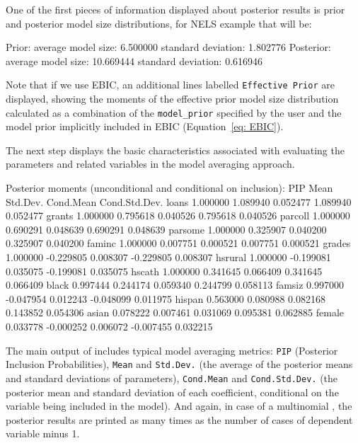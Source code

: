 One of the first pieces of information displayed about
posterior results is prior and posterior model size
distributions, for NELS example that will be:
\begin{CodeChunk}\begin{CodeOutput}
Prior:
	average model size: 6.500000
	standard deviation: 1.802776
Posterior:
	average model size: 10.669444
	standard deviation: 0.616946
\end{CodeOutput}
\end{CodeChunk}

Note that if we use EBIC, an additional lines labelled
\texttt{Effective Prior} are displayed, showing the moments
of the effective prior model size distribution calculated as
a combination of the \texttt{model\_prior} specified by
the user and the model prior implicitly included in EBIC
(Equation~\ref{eq: EBIC}).

The next step displays the basic characteristics associated
with evaluating the parameters and related variables in the
model averaging approach.
\begin{CodeChunk}\begin{CodeOutput}
  Posterior moments (unconditional and conditional on inclusion):
                 PIP        Mean     Std.Dev.    Cond.Mean Cond.Std.Dev.
 loans      1.000000    1.089940    0.052477      1.089940     0.052477
grants      1.000000    0.795618    0.040526      0.795618     0.040526
parcoll     1.000000    0.690291    0.048639      0.690291     0.048639
parsome     1.000000    0.325907    0.040200      0.325907     0.040200
faminc      1.000000    0.007751    0.000521      0.007751     0.000521
grades      1.000000   -0.229805    0.008307     -0.229805     0.008307
hsrural     1.000000   -0.199081    0.035075     -0.199081     0.035075
hscath      1.000000    0.341645    0.066409      0.341645     0.066409
black       0.997444    0.244174    0.059340      0.244799     0.058113
famsiz      0.997000   -0.047954    0.012243     -0.048099     0.011975
hispan      0.563000    0.080988    0.082168      0.143852     0.054306
asian       0.078222    0.007461    0.031069      0.095381     0.062885
female      0.033778   -0.000252    0.006072     -0.007455     0.032215
\end{CodeOutput}
\end{CodeChunk}
The main output of   includes typical model averaging
metrics: \texttt{PIP} (Posterior Inclusion Probabilities),
\texttt{Mean} and \texttt{Std.Dev.} (the average of the posterior
means and standard deviations of parameters), \texttt{Cond.Mean}
and \texttt{Cond.Std.Dev.} (the posterior mean and standard
deviation of each coefficient, conditional on the variable being
included in the model). And again, in case of a multinomial
, the posterior results are printed as many
times as the number of cases of dependent variable minus 1.

